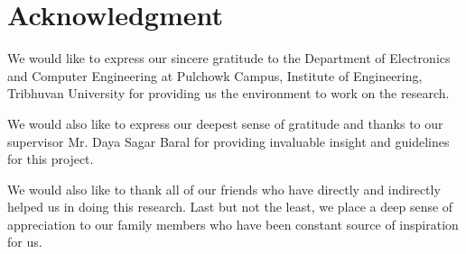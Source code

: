 \documentclass[journal]{IEEEtran}
\begin{document}

%


\section*{Acknowledgment}
We would like to express our sincere gratitude to the ​Department of Electronics and Computer Engineering at Pulchowk Campus, Institute of Engineering, Tribhuvan University for providing us the environment to work on the research.

We would also like to express our deepest sense of gratitude and thanks to our supervisor Mr. Daya Sagar Baral for providing invaluable insight and guidelines for this project.

We would also like to thank all of our friends who have directly and indirectly helped us in doing this research. Last but not the least, we place a deep sense of appreciation to our family members who have been constant source of inspiration for us.


\ifCLASSOPTIONcaptionsoff
  \newpage
\fi



\end{document}
